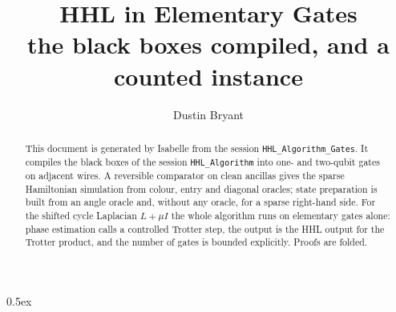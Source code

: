 \documentclass[11pt,a4paper]{article}
\begin{document}
\title{HHL in Elementary Gates\\[0.5em]
  \large the black boxes compiled, and a counted instance}
\author{Dustin Bryant}
\maketitle

\begin{abstract}
This document is generated by Isabelle from the session \texttt{HHL\_Algorithm\_Gates}.  It
compiles the black boxes of the session \texttt{HHL\_Algorithm} into one- and two-qubit gates on
adjacent wires.  A reversible comparator on clean ancillas gives the sparse Hamiltonian simulation
from colour, entry and diagonal oracles; state preparation is built from an angle oracle and,
without any oracle, for a sparse right-hand side.  For the shifted cycle Laplacian $L+\mu I$ the
whole algorithm runs on elementary gates alone: phase estimation calls a controlled Trotter step,
the output is the HHL output for the Trotter product, and the number of gates is bounded
explicitly.  Proofs are folded.
\end{abstract}

\tableofcontents

\parindent 0pt\parskip 0.5ex


\end{document}
